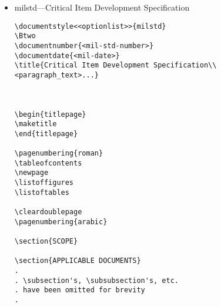 \begin{itemize}
\begin{small}
\begin{verbatim}
\section{NOTES}

\appendix
%
% \section will now generate appendices starting with section 10, 20, etc.
%
\section{<text>} % Section 10, Appendix I

\section{<text>} % Section 20, Appendix II


\end{verbatim}
\end{small}

\item milstd---Critical Item Development Specification

\begin{small}
\begin{verbatim}
\documentstyle<<optionlist>>{milstd}
\Btwo
\documentnumber{<mil-std-number>}
\documentdate{<mil-date>}
\title{Critical Item Development Specification\\
<paragraph_text>...}



\begin{titlepage}
\maketitle
\end{titlepage}

\pagenumbering{roman}
\tableofcontents
\newpage
\listoffigures
\listoftables

\cleardoublepage
\pagenumbering{arabic}

\section{SCOPE}

\section{APPLICABLE DOCUMENTS}
.
. \subsection's, \subsubsection's, etc.
. have been omitted for brevity
.


\end{verbatim}
\end{small}
\end{itemize}
